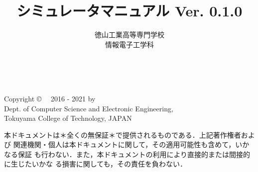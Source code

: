 \documentclass[a4paper,11pt,twocolumn]{ltjsbook}
\newcommand{\ver}{Ver. 0.1.0}
\begin{document}
\title{\tac シミュレータマニュアル \ver}
\author{徳山工業高等専門学校\\情報電子工学科}
\date{}
\maketitle

\thispagestyle{empty}
\onecolumn
~
\vfill
\begin{flushleft}
Copyright \copyright ~~ 2016 - 2021 by \\
Dept. of Computer Science and Electronic Engineering, \\
Tokuyama College of Technology, JAPAN
\end{flushleft}

\vspace{0.8cm}

本ドキュメントは＊全くの無保証＊で提供されるものである．上記著作権者および
関連機関・個人は本ドキュメントに関して，その適用可能性も含めて，いかなる保証
も行わない．また，本ドキュメントの利用により直接的または間接的に生じたいかな
る損害に関しても，その責任を負わない．

\setcounter{tocdepth}{1}
\tableofcontents





\vfill
\end{document}
